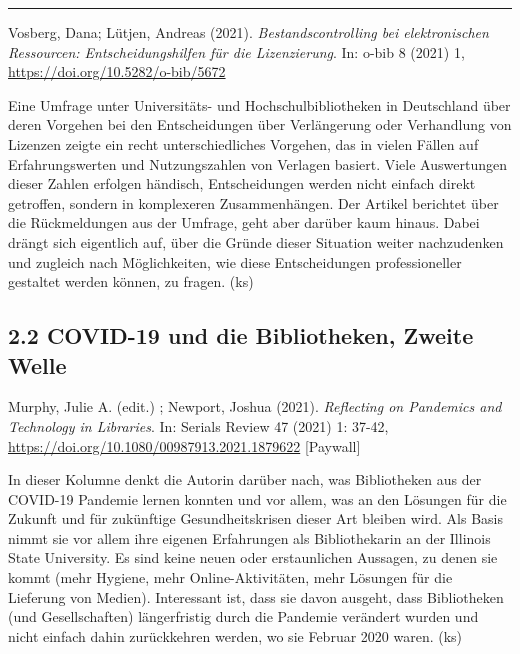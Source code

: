 \documentclass[a4paper,
fontsize=11pt,
oneside,
numbers=noperiodatend,
parskip=half-,
bibliography=totoc,
final
]{scrartcl}
\begin{document}
\begin{center}\rule{0.5\linewidth}{0.5pt}\end{center}

Vosberg, Dana; Lütjen, Andreas (2021). \emph{Bestandscontrolling bei
elektronischen Ressourcen: Entscheidungshilfen für die Lizenzierung}.
In: o-bib 8 (2021) 1, \url{https://doi.org/10.5282/o-bib/5672}

Eine Umfrage unter Universitäts- und Hochschulbibliotheken in
Deutschland über deren Vorgehen bei den Entscheidungen über Verlängerung
oder Verhandlung von Lizenzen zeigte ein recht unterschiedliches
Vorgehen, das in vielen Fällen auf Erfahrungswerten und Nutzungszahlen
von Verlagen basiert. Viele Auswertungen dieser Zahlen erfolgen
händisch, Entscheidungen werden nicht einfach direkt getroffen, sondern
in komplexeren Zusammenhängen. Der Artikel berichtet über die
Rückmeldungen aus der Umfrage, geht aber darüber kaum hinaus. Dabei
drängt sich eigentlich auf, über die Gründe dieser Situation weiter
nachzudenken und zugleich nach Möglichkeiten, wie diese Entscheidungen
professioneller gestaltet werden können, zu fragen. (ks)

\pagebreak

\hypertarget{covid-19-und-die-bibliotheken-zweite-welle}{%
\subsection{2.2 COVID-19 und die Bibliotheken, Zweite
Welle}\label{covid-19-und-die-bibliotheken-zweite-welle}}

Murphy, Julie A. (edit.) ; Newport, Joshua (2021). \emph{Reflecting on
Pandemics and Technology in Libraries}. In: Serials Review 47 (2021) 1:
37-42, \url{https://doi.org/10.1080/00987913.2021.1879622} {[}Paywall{]}

In dieser Kolumne denkt die Autorin darüber nach, was Bibliotheken aus
der COVID-19 Pandemie lernen konnten und vor allem, was an den Lösungen
für die Zukunft und für zukünftige Gesundheitskrisen dieser Art bleiben
wird. Als Basis nimmt sie vor allem ihre eigenen Erfahrungen als
Bibliothekarin an der Illinois State University. Es sind keine neuen
oder erstaunlichen Aussagen, zu denen sie kommt (mehr Hygiene, mehr
Online-Aktivitäten, mehr Lösungen für die Lieferung von Medien).
Interessant ist, dass sie davon ausgeht, dass Bibliotheken (und
Gesellschaften) längerfristig durch die Pandemie verändert wurden und
nicht einfach dahin zurückkehren werden, wo sie Februar 2020 waren. (ks)
\end{document}
